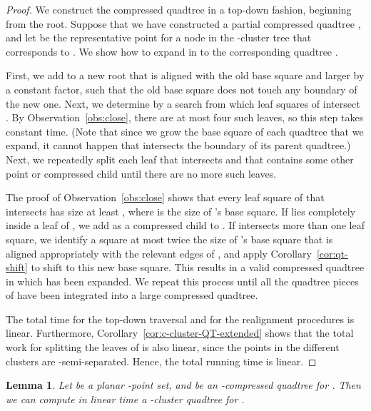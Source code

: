 \documentclass[11pt]{paper}
\newtheorem {lem}[theorem] {Lemma}
\begin{document}
    \begin{proof} 
      We construct the compressed quadtree in a top-down fashion, 
      beginning from the root. Suppose that we have constructed a
      partial compressed quadtree , and let  be the representative
      point for a node  in the -cluster tree 
       that corresponds
      to . We show how to expand  in  to the corresponding
      quadtree . 

      First, we add to  a new root that is aligned with the
      old base square and larger by a constant factor, such that
      the old base square does not touch any boundary of the
      new one. Next, we determine by a search from 
      which leaf squares of  intersect
      . By Observation~\ref{obs:close}, there are at most
      four such leaves, so this step takes constant time.
      (Note that since we grow the base square of each quadtree that we
      expand, it cannot happen that  intersects the boundary of
      its parent quadtree.) Next, we repeatedly split
      each leaf that intersects  and that contains some other point
      or compressed child until there are no more such leaves.

      The proof of Observation~\ref{obs:close} shows that
      every leaf square of  that intersects
       has size at least , where 
      is the size of 's base square.
      If  lies completely inside a
      leaf of , we add  as a compressed child to . 
      If  intersects more than one leaf square,  we
      identify a square at most twice the size of 's base square that is
      aligned appropriately with the relevant edges of , 
       and apply Corollary~\ref{cor:qt-shift} to shift  
       to this new base square.  
      This results in a valid  compressed quadtree in which
       has been expanded. We repeat this process until all the quadtree
      pieces of  have been integrated into a large compressed quadtree.

      The total time for the top-down traversal and for the realignment
      procedures is linear. Furthermore, 
      Corollary~\ref{cor:c-cluster-QT-extended} shows that the 
      total work for splitting
      the leaves of  is also linear, since the points in the different
      clusters are -semi-separated. Hence, the total running time
      is linear.
    \end{proof}

    \begin{lem}\label{lem:compressed->c-cluster}
      Let  be a planar -point set, and  be an -compressed
      quadtree for . Then we can compute in linear time a
      -cluster quadtree for .
    \end{lem}
\end{document}
